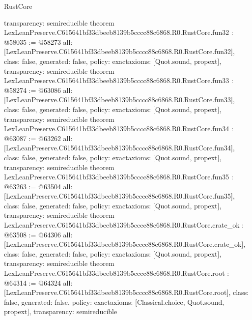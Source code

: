 \begin{lexlean}{RustCore}
\begin{coremodule}
{  transparency: semireducible
}
theorem LexLeanPreserve.C615641bf33dbeeb8139b5cccc88c6868.R0.RustCore.fun32 : @58035 := @58273 {
  all: [LexLeanPreserve.C615641bf33dbeeb8139b5cccc88c6868.R0.RustCore.fun32],
  class: false,
  generated: false,
  policy: exact{axioms: [Quot.sound, propext]},
  transparency: semireducible
}
theorem LexLeanPreserve.C615641bf33dbeeb8139b5cccc88c6868.R0.RustCore.fun33 : @58274 := @63086 {
  all: [LexLeanPreserve.C615641bf33dbeeb8139b5cccc88c6868.R0.RustCore.fun33],
  class: false,
  generated: false,
  policy: exact{axioms: [Quot.sound, propext]},
  transparency: semireducible
}
theorem LexLeanPreserve.C615641bf33dbeeb8139b5cccc88c6868.R0.RustCore.fun34 : @63087 := @63262 {
  all: [LexLeanPreserve.C615641bf33dbeeb8139b5cccc88c6868.R0.RustCore.fun34],
  class: false,
  generated: false,
  policy: exact{axioms: [Quot.sound, propext]},
  transparency: semireducible
}
theorem LexLeanPreserve.C615641bf33dbeeb8139b5cccc88c6868.R0.RustCore.fun35 : @63263 := @63504 {
  all: [LexLeanPreserve.C615641bf33dbeeb8139b5cccc88c6868.R0.RustCore.fun35],
  class: false,
  generated: false,
  policy: exact{axioms: [Quot.sound, propext]},
  transparency: semireducible
}
theorem LexLeanPreserve.C615641bf33dbeeb8139b5cccc88c6868.R0.RustCore.crate_ok : @63508 := @64306 {
  all: [LexLeanPreserve.C615641bf33dbeeb8139b5cccc88c6868.R0.RustCore.crate_ok],
  class: false,
  generated: false,
  policy: exact{axioms: [Quot.sound, propext]},
  transparency: semireducible
}
theorem LexLeanPreserve.C615641bf33dbeeb8139b5cccc88c6868.R0.RustCore.root : @64314 := @64324 {
  all: [LexLeanPreserve.C615641bf33dbeeb8139b5cccc88c6868.R0.RustCore.root],
  class: false,
  generated: false,
  policy: exact{axioms: [Classical.choice, Quot.sound, propext]},
  transparency: semireducible
}


\end{coremodule}
\end{lexlean}
